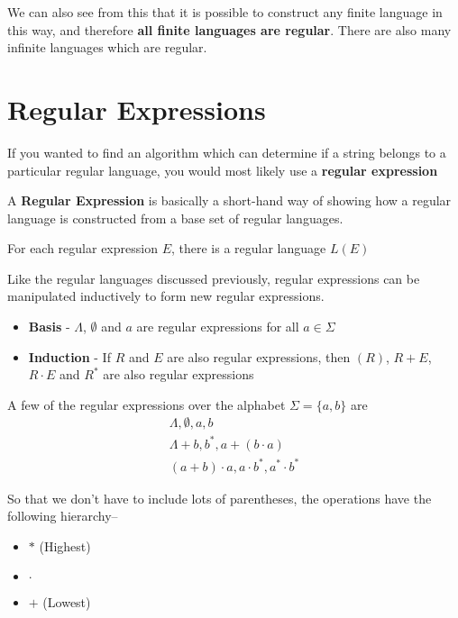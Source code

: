 We can also see from this that it is possible to construct any finite language in this way, and therefore \textbf{all
 finite languages are regular}. There are also many infinite languages which are regular.

\section*{Regular Expressions}

If you wanted to find an algorithm which can determine if a string belongs to a particular regular language, you would
 most likely use a \textbf{regular expression}

\begin{definition*}{}{}
  A \textbf{Regular Expression} is basically a short-hand way of showing how a regular language is constructed from a
   base set of regular languages.

  For each regular expression $E$, there is a regular language $L(E)$
\end{definition*}

Like the regular languages discussed previously, regular expressions can be manipulated inductively to form new regular
 expressions.

\begin{itemize}
  \item \textbf{Basis} - $\Lambda$, $\emptyset$ and $a$ are regular expressions for all $a \in \Sigma$
  \item \textbf{Induction} - If $R$ and $E$ are also regular expressions, then $(R)$, $R + E$, $R \cdot E$ and $R^*$ are
   also regular expressions
\end{itemize}

\begin{example*}{}{}
  A few of the regular expressions over the alphabet $\Sigma = \{a, b\}$ are
  \begin{gather*}
    \Lambda, \emptyset, a, b\\
    \Lambda + b, b^*, a + (b \cdot a)\\
    (a + b) \cdot a, a \cdot b^*, a^* \cdot b^*
  \end{gather*}
\end{example*}

So that we don't have to include lots of parentheses, the operations have the following hierarchy--
\begin{itemize}
  \item $*$ (Highest)
  \item $\cdot$
  \item $+$ (Lowest)
\end{itemize}

